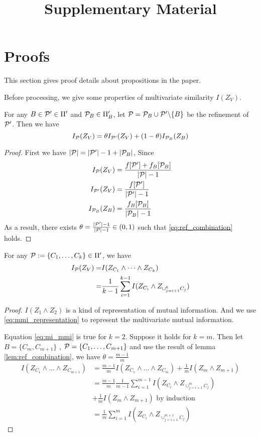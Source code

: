 \documentclass{article}
\title{Supplementary Material}
\begin{document}
\maketitle
\appendix
\section{Proofs}
This section gives proof details about propositions in the paper.

Before processing, we give some properties of multivariate similarity $I(Z_V)$.
\begin{lemma}\label{lem:ref_combination}
For any $B \in \P' \in \Pi'$ and $\P_B \in \Pi'_B$, let $\P = \P_B \cup \P' \backslash \{B\} $
be the refinement of $\P'$. Then we have
\begin{equation}\label{eq:ref_combination}
I_{\P}(Z_V) = \theta I_{\P'}(Z_V) + (1-\theta) I_{\P_B}(Z_B)
\end{equation}
\end{lemma}
\begin{proof}
	First we have $\abs{\P} = \abs{\P'} -1 + \abs{\P_B}$,
	Since
	\begin{align*}
		I_{\P}(Z_V) & = { f[\P'] + f_B[\P_B] \over \abs{\P} - 1} \\
		I_{\P'}(Z_V) & = { f[\P'] \over \abs{\P'} - 1} \\
		I_{\P_B}(Z_B) & = { f_B[\P_B] \over \abs{\P_B} - 1}
	\end{align*}
	As a result, there exists $\theta = {\abs{\P'} - 1 \over \abs{\P} - 1} \in (0,1)$ such that 
	\eqref{eq:ref_combination} holds.
\end{proof}
\begin{lemma}\label{lem:mi_split}
For any $\P:=\{C_1, \dots, C_k\} \in \Pi'$, we have
\begin{align}
I_{\P}(Z_V) =& I(Z_{C_1} \wedge \dots \wedge Z_{C_k}) \label{eq:mmi_representation} \\
=& { 1 \over k-1} \sum_{i=1}^{k-1} I(Z_{C_i} \wedge Z_{\cup_{j=i+1}^k C_j}) \label{eq:mi_mmi}
\end{align}
\end{lemma}
\begin{proof}
$I(Z_1 \wedge Z_2)$ is a kind of representation of mutual information.
And we use \eqref{eq:mmi_representation} to represent the multivariate mutual information.

Equation \eqref{eq:mi_mmi} is true for $k=2$. Suppose it holds for $k=m$. Then
let $B=\{C_m, C_{m+1}\}$ , $\P=\{C_1, \dots, C_{m+1}\}$
and use the result of lemma \ref{lem:ref_combination}, 
we have $\theta = \frac{m-1}{m}$
\begin{align*}
I(Z_{C_1} \wedge \dots \wedge Z_{C_{m+1}}) & = 
 \frac{m-1}{m} I(Z_{C_1} \wedge \dots \wedge Z_{C_m})
+ \frac{1}{m}  I(Z_{m} \wedge Z_{m+1}) \\
& = \frac{m-1}{m} \frac{1}{m-1}\sum_{i=1}^{m-1} I(Z_{C_i} \wedge Z_{\cup_{j=i+1}^m C_j})\\
& + \frac{1}{m}  I(Z_{m} \wedge Z_{m+1})\textrm{ by induction} \\
& = \frac{1}{m} \sum_{i=1}^{m} I(Z_{C_i} \wedge Z_{\cup_{j=i+1}^{m+1} C_j})
\end{align*}
\end{proof}
\end{document}
